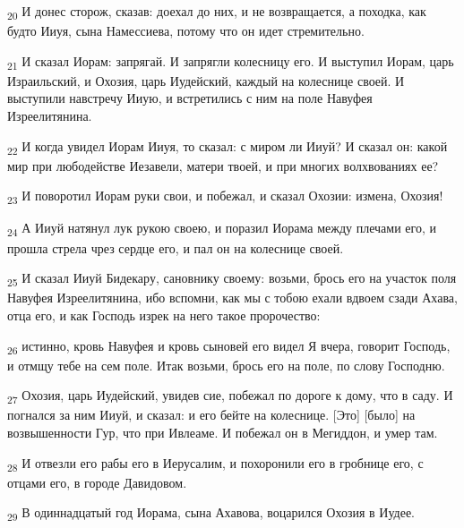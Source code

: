 \begin{tcolorbox}
\textsubscript{20} И донес сторож, сказав: доехал до них, и не возвращается, а походка, как будто Ииуя, сына Намессиева, потому что он идет стремительно.
\end{tcolorbox}
\begin{tcolorbox}
\textsubscript{21} И сказал Иорам: запрягай. И запрягли колесницу его. И выступил Иорам, царь Израильский, и Охозия, царь Иудейский, каждый на колеснице своей. И выступили навстречу Ииую, и встретились с ним на поле Навуфея Изреелитянина.
\end{tcolorbox}
\begin{tcolorbox}
\textsubscript{22} И когда увидел Иорам Ииуя, то сказал: с миром ли Ииуй? И сказал он: какой мир при любодействе Иезавели, матери твоей, и при многих волхвованиях ее?
\end{tcolorbox}
\begin{tcolorbox}
\textsubscript{23} И поворотил Иорам руки свои, и побежал, и сказал Охозии: измена, Охозия!
\end{tcolorbox}
\begin{tcolorbox}
\textsubscript{24} А Ииуй натянул лук рукою своею, и поразил Иорама между плечами его, и прошла стрела чрез сердце его, и пал он на колеснице своей.
\end{tcolorbox}
\begin{tcolorbox}
\textsubscript{25} И сказал Ииуй Бидекару, сановнику своему: возьми, брось его на участок поля Навуфея Изреелитянина, ибо вспомни, как мы с тобою ехали вдвоем сзади Ахава, отца его, и как Господь изрек на него такое пророчество:
\end{tcolorbox}
\begin{tcolorbox}
\textsubscript{26} истинно, кровь Навуфея и кровь сыновей его видел Я вчера, говорит Господь, и отмщу тебе на сем поле. Итак возьми, брось его на поле, по слову Господню.
\end{tcolorbox}
\begin{tcolorbox}
\textsubscript{27} Охозия, царь Иудейский, увидев сие, побежал по дороге к дому, что в саду. И погнался за ним Ииуй, и сказал: и его бейте на колеснице. [Это] [было] на возвышенности Гур, что при Ивлеаме. И побежал он в Мегиддон, и умер там.
\end{tcolorbox}
\begin{tcolorbox}
\textsubscript{28} И отвезли его рабы его в Иерусалим, и похоронили его в гробнице его, с отцами его, в городе Давидовом.
\end{tcolorbox}
\begin{tcolorbox}
\textsubscript{29} В одиннадцатый год Иорама, сына Ахавова, воцарился Охозия в Иудее.
\end{tcolorbox}
